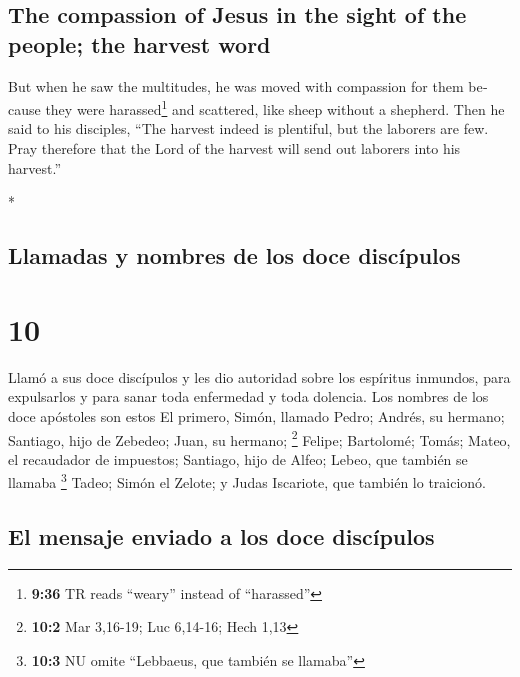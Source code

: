 \begin{paracol}{2}
\begin{otherlanguage}{english}
\hypertarget{the-compassion-of-jesus-in-the-sight-of-the-people-the-harvest-word}{%
\subsection{The compassion of Jesus in the sight of the people; the
harvest
word}\label{the-compassion-of-jesus-in-the-sight-of-the-people-the-harvest-word}}

 But when he saw the multitudes, he was moved with
compassion for them because they were harassed\footnote{\textbf{9:36} TR
  reads ``weary'' instead of ``harassed''} and scattered, like sheep
without a shepherd.  Then he said to his disciples, ``The
harvest indeed is plentiful, but the laborers are few. 
Pray therefore that the Lord of the harvest will send out laborers into
his harvest.''

\end{otherlanguage}

\switchcolumn[0]*

\hypertarget{llamadas-y-nombres-de-los-doce-discuxedpulos}{%
\subsection{Llamadas y nombres de los doce
discípulos}\label{llamadas-y-nombres-de-los-doce-discuxedpulos}}

\hypertarget{section-18}{%
\section{10}\label{section-18}}

 Llamó a sus doce discípulos y les dio autoridad sobre los
espíritus inmundos, para expulsarlos y para sanar toda enfermedad y toda
dolencia.  Los nombres de los doce apóstoles son estos El
primero, Simón, llamado Pedro; Andrés, su hermano; Santiago, hijo de
Zebedeo; Juan, su hermano; \footnote{\textbf{10:2} Mar 3,16-19; Luc
  6,14-16; Hech 1,13}  Felipe; Bartolomé; Tomás; Mateo, el
recaudador de impuestos; Santiago, hijo de Alfeo; Lebeo, que también se
llamaba \footnote{\textbf{10:3} NU omite ``Lebbaeus, que también se
  llamaba''} Tadeo;  Simón el Zelote; y Judas Iscariote,
que también lo traicionó.

\hypertarget{el-mensaje-enviado-a-los-doce-discuxedpulos}{%
\subsection{El mensaje enviado a los doce
discípulos}\label{el-mensaje-enviado-a-los-doce-discuxedpulos}}


\end{paracol}
